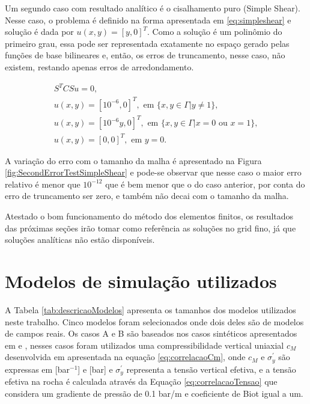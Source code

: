     
Um segundo caso com resultado analítico é o cisalhamento puro (Simple Shear). Nesse caso, o problema é definido na forma apresentada em \eqref{eq:simpleshear}  e solução é dada por $u(x,y) = [y, 0]^T$. Como a solução é um polinômio do primeiro grau, essa pode ser representada exatamente no espaço gerado pelas funções de base bilineares e, então, os erros de truncamento, nesse caso, não existem, restando apenas  erros de arredondamento. 

\begin{equation}\label{eq:simpleshear}
    \begin{aligned}
        S^T C S u = 0, \\
        u(x,y) = [10^{-6}, 0]^T, \text{ em } \{x, y \in \Gamma | y \neq 1\} ,\\
        u(x,y) = [10^{-6}y, 0]^T, \text{ em } \{x, y \in \Gamma | x = 0 \text{ ou } x = 1\}, \\
        u(x,y) = [0, 0]^T, \text{ em } y=0.
    \end{aligned}
\end{equation}

A variação do erro com o tamanho da malha é apresentado na Figura \ref{fig:SecondErrorTestSimpleShear} e pode-se observar que nesse caso o maior erro relativo é menor que $10^{-12}$ que é bem menor que o do caso anterior, por conta do erro de truncamento ser zero, e também não decai com o tamanho da malha.

Atestado o bom funcionamento do método dos elementos finitos, os resultados das próximas seções irão tomar como referência as soluções no grid fino, já que soluções analíticas não estão disponíveis.


\section{Modelos de simulação utilizados}

 A Tabela \ref{tab:descricaoModelos} apresenta os tamanhos dos modelos utilizados neste trabalho. Cinco modelos foram selecionados onde dois deles são de modelos de campos reais. Os casos A e B são baseados nos casos sintéticos apresentados em \cite{casteletto} e \cite{irina}, nesses casos foram utilizados uma compressibilidade vertical uniaxial $c_M$ desenvolvida em \cite{correlacaoE} apresentada na equação \eqref{eq:correlacaoCm}, onde $c_M$ e $\sigma_y^\prime$ são expressas em [bar$^{-1}$] e [bar] e  $\sigma_y^\prime$ representa a tensão vertical efetiva, e a tensão efetiva na rocha é calculada através da Equação \eqref{eq:correlacaoTensao} que considera um gradiente de pressão de 0.1 bar/m e coeficiente de Biot igual a um.

